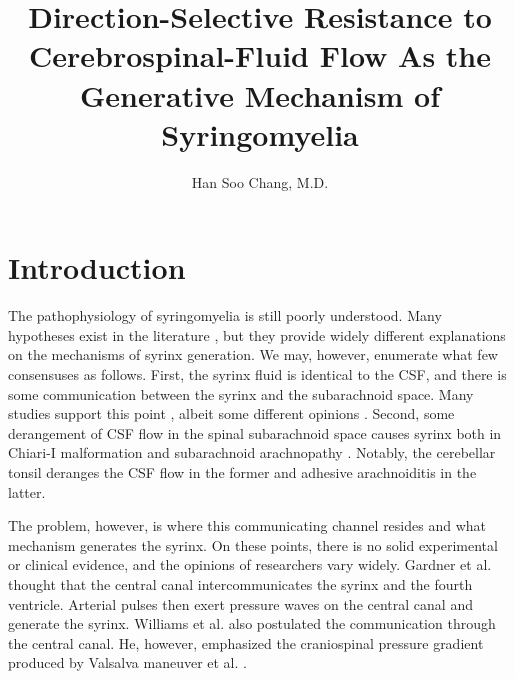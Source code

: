 \documentclass[fleqn,10pt]{wlscirep}
\title{Direction-Selective Resistance to Cerebrospinal-Fluid Flow As
the Generative Mechanism of Syringomyelia}
\author{Han Soo Chang, M.D.}
\affil{Department of Neurosurgery, Tokai University\\Isehara, Japan}
\begin{document}
\flushbottom
\maketitle
%
%
\thispagestyle{empty}


\section*{Introduction}

The pathophysiology of syringomyelia is still poorly understood. Many
hypotheses exist in the literature \cite{gardner1958mechanism,
williams1980pathogenesis, milhorat1999chiari, ball1972pathogenesis,
klekamp2002pathophysiology, duboulay1974mechanism, heiss1999elucidating,
milhorat1993anatomical, stoodley2000pathophysiology, terae1994increased,
chang2003hypothesis, chang2004theoretical, greitz2006unraveling}, but they
provide widely different explanations on the mechanisms of syrinx
generation. We may, however, enumerate what few consensuses as follows.
First, the syrinx fluid is identical to the CSF, and there is some
communication between the syrinx and the subarachnoid space. Many studies
support this point \cite{ellertsson1969syringomyelia,
ellertsson1969myelocystographic, li1987conventional, heiss2019origin},
albeit some different opinions \cite{greitz2006unraveling,
koyanagi1997surgical}. Second, some derangement of CSF flow in the spinal
subarachnoid space causes syrinx both in Chiari-I malformation
\cite{wolpert1994chiari, bhadelia1995cerebrospinal, heiss1999elucidating,
hofmann2000phasecontrast, quigley2004cerebrospinal} and subarachnoid
arachnopathy \cite{klekamp1997treatment, brodbelt2003altered,
heiss2012pathophysiology, chang2014dorsal}. Notably, the cerebellar tonsil
deranges the CSF flow in the former and adhesive arachnoiditis in the
latter.

The problem, however, is where this communicating channel resides and what
mechanism generates the syrinx. On these points, there is no solid
experimental or clinical evidence, and the opinions of researchers vary
widely. Gardner et al. \cite{gardner1958mechanism} thought that the central
canal intercommunicates the syrinx and the fourth ventricle. Arterial
pulses then exert pressure waves on the central canal and generate the
syrinx. Williams et al. also postulated the communication through the
central canal. He, however, emphasized the craniospinal pressure gradient
produced by Valsalva maneuver et al. \cite{williams1980pathogenesis}.
\end{document}
